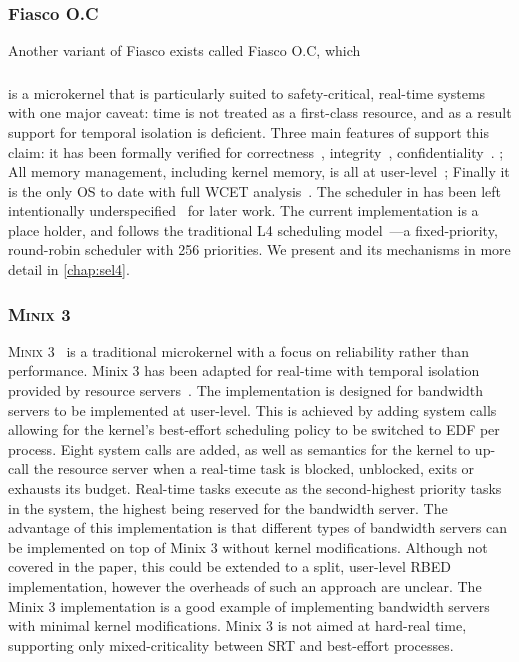\subsubsection{Fiasco O.C}

Another variant of Fiasco exists called Fiasco O.C, which 

\subsubsection{\selfour} 
\label{s:background_sel4}

\selfour is a microkernel that is particularly suited to safety-critical, real-time systems
with one major caveat: time is not treated as a first-class resource, and as a result support for
temporal isolation is deficient. Three main features of \selfour
support this claim: it has been formally verified for correctness~\citep{Klein_EHACDEEKNSTW_09,
Klein_AEMSKH_14}, integrity~\citep{Sewell_WGMAK_11}, confidentiality~\citep{Murray_MBGBSLGK_13}.
; All memory management, including kernel memory, is all at
user-level~\citep{Elkaduwe_Derrin_06}; Finally it is the only \gls{OS} to date with full \gls{WCET}
analysis~\citep{Sewell_KH_16}.  The scheduler in \selfour has been left intentionally
underspecified~\citep{Petters_EH_12} for later work.  The current implementation is a place holder,
and follows the traditional L4 scheduling model~\citep{Ruocco_06}---a fixed-priority, round-robin
scheduler with 256 priorities. We present \selfour and its mechanisms in more detail in
\cref{chap:sel4}.

\subsubsection{\textsc{Minix 3}}

\textsc{Minix 3}~\citep{Herder_BGHT_06} is a traditional microkernel with a focus on
reliability rather than performance.  {\sc Minix 3} has been adapted for real-time with temporal
isolation provided by resource servers~\citep{Mancina_LFHGT_09}.  The implementation is designed for
bandwidth servers to be implemented at user-level.  This is achieved by adding system calls allowing
for the kernel's best-effort scheduling policy to be switched to \gls{EDF} per process.  Eight
system calls are added, as well as semantics for the kernel to up-call the resource server when a
real-time task is blocked, unblocked, exits or exhausts its budget.  Real-time tasks execute as the
second-highest priority tasks in the system, the highest being reserved for the bandwidth server.
The advantage of this implementation is that different types of bandwidth servers can be implemented
on top of {\sc Minix 3} without kernel modifications.  Although not covered in the paper, this could
be extended to a split, user-level \gls{RBED} implementation, however the overheads of such an
approach are unclear.  The {\sc Minix 3} implementation is a good example of implementing bandwidth
servers with minimal kernel modifications.  {\sc Minix 3} is not aimed at hard-real time, supporting
only mixed-criticality between \gls{SRT} and best-effort processes.

